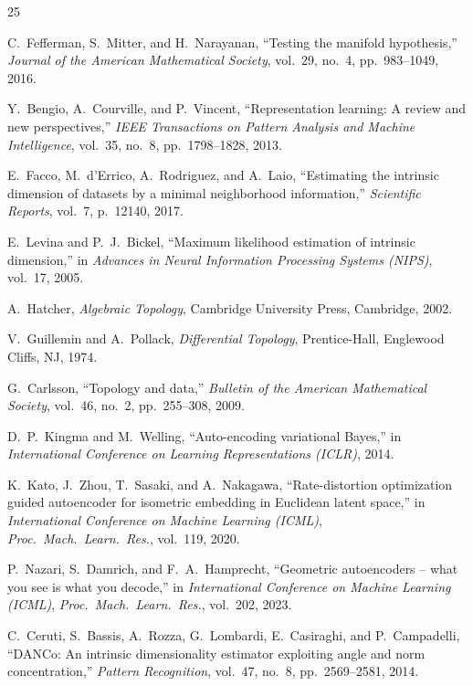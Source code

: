 \documentclass[lettersize,journal]{IEEEtran}
\begin{document}
\begin{thebibliography}{25}

C.~Fefferman, S.~Mitter, and H.~Narayanan,
``Testing the manifold hypothesis,''
\textit{Journal of the American Mathematical Society}, vol.~29, no.~4,
pp.~983--1049, 2016.

Y.~Bengio, A.~Courville, and P.~Vincent,
``Representation learning: A review and new perspectives,''
\textit{IEEE Transactions on Pattern Analysis and Machine Intelligence},
vol.~35, no.~8, pp.~1798--1828, 2013.

E.~Facco, M.~d'Errico, A.~Rodriguez, and A.~Laio,
``Estimating the intrinsic dimension of datasets by a minimal neighborhood information,''
\textit{Scientific Reports}, vol.~7, p.~12140, 2017.

E.~Levina and P.~J.~Bickel,
``Maximum likelihood estimation of intrinsic dimension,''
in \textit{Advances in Neural Information Processing Systems (NIPS)}, vol.~17, 2005.

A.~Hatcher,
\textit{Algebraic Topology},
Cambridge University Press, Cambridge, 2002.

V.~Guillemin and A.~Pollack,
\textit{Differential Topology},
Prentice-Hall, Englewood Cliffs, NJ, 1974.

G.~Carlsson,
``Topology and data,''
\textit{Bulletin of the American Mathematical Society},
vol.~46, no.~2, pp.~255--308, 2009.

D.~P.~Kingma and M.~Welling,
``Auto-encoding variational Bayes,''
in \textit{International Conference on Learning Representations (ICLR)}, 2014.

K.~Kato, J.~Zhou, T.~Sasaki, and A.~Nakagawa,
``Rate-distortion optimization guided autoencoder for isometric embedding in Euclidean latent space,''
in \textit{International Conference on Machine Learning (ICML)},
\textit{Proc.~Mach.~Learn.~Res.}, vol.~119, 2020.

P.~Nazari, S.~Damrich, and F.~A.~Hamprecht,
``Geometric autoencoders -- what you see is what you decode,''
in \textit{International Conference on Machine Learning (ICML)},
\textit{Proc.~Mach.~Learn.~Res.}, vol.~202, 2023.

C.~Ceruti, S.~Bassis, A.~Rozza, G.~Lombardi, E.~Casiraghi, and P.~Campadelli,
``DANCo: An intrinsic dimensionality estimator exploiting angle and norm concentration,''
\textit{Pattern Recognition}, vol.~47, no.~8, pp.~2569--2581, 2014.


\end{thebibliography}
\end{document}
